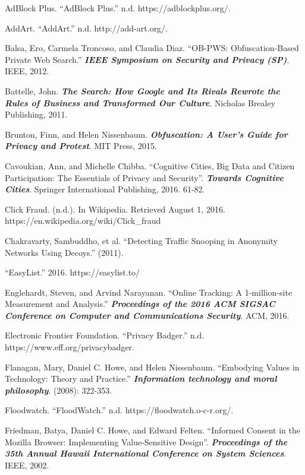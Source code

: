 \documentclass[conference]{IEEEtran}
\begin{document}
\begin{thebibliography}{99}

 AdBlock Plus. “AdBlock Plus.” n.d. https://adblockplus.org/.

 AddArt. “AddArt.” n.d. http://add-art.org/.

 Balsa, Ero, Carmela Troncoso, and Claudia Diaz. ``OB-PWS: Obfuscation-Based Private Web Search.'' \textbf{\textit{IEEE Symposium on Security and Privacy (SP)}}. IEEE, 2012.

 Battelle, John. \textbf{\textit{ The Search: How Google and Its Rivals Rewrote the Rules of Business and Transformed Our Culture}}. Nicholas Brealey Publishing, 2011.

 Brunton, Finn, and Helen Nissenbaum. \textbf{\textit{Obfuscation: A User's Guide for Privacy and Protest}}. MIT Press, 2015.

 Cavoukian, Ann, and Michelle Chibba. “Cognitive Cities, Big Data and Citizen Participation: The Essentials of Privacy and Security”. \textbf{\textit{Towards Cognitive Cities}}. Springer International Publishing, 2016. 61-82.

 Click Fraud. (n.d.). In Wikipedia. Retrieved August 1, 2016. https://en.wikipedia.org/wiki/Click\_fraud

 Chakravarty, Sambuddho, et al. “Detecting Traffic Snooping in Anonymity Networks Using Decoys.” (2011).

 “EasyList.” 2016. https://easylist.to/

 Englehardt, Steven, and Arvind Narayanan. “Online Tracking: A 1-million-site Measurement and Analysis.” \textbf{\textit{Proceedings of the 2016 ACM SIGSAC Conference on Computer and Communications Security}}. ACM, 2016.

 Electronic Frontier Foundation. “Privacy Badger.” n.d. https://www.eff.org/privacybadger.

 Flanagan, Mary, Daniel C. Howe, and Helen Nissenbaum. “Embodying Values in Technology: Theory and Practice.” \textbf{\textit{Information technology and moral philosophy}}. (2008): 322-353.

 Floodwatch. “FloodWatch.” n.d. https://floodwatch.o-c-r.org/.

 Friedman, Batya, Daniel C. Howe, and Edward Felten. “Informed Consent in the Mozilla Browser: Implementing Value-Sensitive Design”. \textbf{\textit{Proceedings of the 35th Annual Hawaii International Conference on System Sciences}}. IEEE, 2002.


\end{thebibliography}
\end{document}
